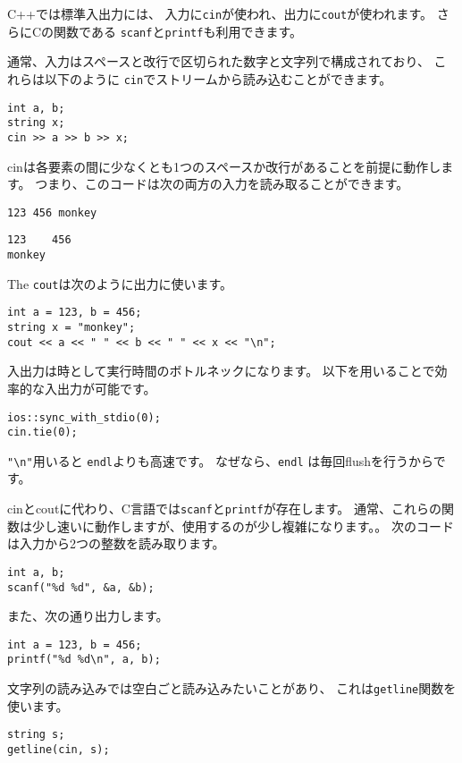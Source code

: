 C++では標準入出力には、
入力に\texttt{cin}が使われ、出力に\texttt{cout}が使われます。
さらにCの関数である
\texttt{scanf}と\texttt{printf}も利用できます。

通常、入力はスペースと改行で区切られた数字と文字列で構成されており、
これらは以下のように
\texttt{cin}でストリームから読み込むことができます。

\begin{lstlisting}
int a, b;
string x;
cin >> a >> b >> x;
\end{lstlisting}


cinは各要素の間に少なくとも1つのスペースか改行があることを前提に動作します。
つまり、このコードは次の両方の入力を読み取ることができます。

\begin{lstlisting}
123 456 monkey
\end{lstlisting}
\begin{lstlisting}
123    456
monkey
\end{lstlisting}
The \texttt{cout}は次のように出力に使います。
\begin{lstlisting}
int a = 123, b = 456;
string x = "monkey";
cout << a << " " << b << " " << x << "\n";
\end{lstlisting}

入出力は時として実行時間のボトルネックになります。
以下を用いることで効率的な入出力が可能です。

\begin{lstlisting}
ios::sync_with_stdio(0);
cin.tie(0);
\end{lstlisting}

\texttt{"\textbackslash n"}用いると
\texttt{endl}よりも高速です。
なぜなら、\texttt{endl} は毎回flushを行うからです。

cinとcoutに代わり、C言語では\texttt{scanf}と\texttt{printf}が存在します。
通常、これらの関数は少し速いに動作しますが、使用するのが少し複雑になります。。
次のコードは入力から2つの整数を読み取ります。
\begin{lstlisting}
int a, b;
scanf("%d %d", &a, &b);
\end{lstlisting}
また、次の通り出力します。
\begin{lstlisting}
int a = 123, b = 456;
printf("%d %d\n", a, b);
\end{lstlisting}

文字列の読み込みでは空白ごと読み込みたいことがあり、
これは\texttt{getline}関数を使います。

\begin{lstlisting}
string s;
getline(cin, s);
\end{lstlisting}

